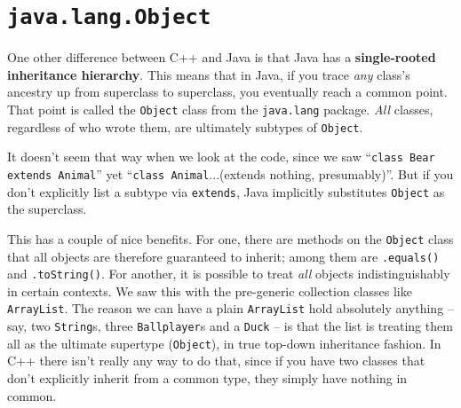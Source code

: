 \section{\texttt{java.lang.Object}}

One other difference between C++ and Java is that Java has a
\textbf{single-rooted inheritance hierarchy}. This means that in Java, if you
trace \textit{any} class's ancestry up from superclass to superclass, you
eventually reach a common point. That point is called the \texttt{Object}
class from the \texttt{java.lang} package. \textit{All} classes, regardless of
who wrote them, are ultimately subtypes of \texttt{Object}.

It doesn't seem that way when we look at the code, since we saw
``\texttt{class Bear extends Animal}'' yet ``\texttt{class Animal}...(extends
nothing, presumably)''. But if you don't explicitly list a subtype via
\texttt{extends}, Java implicitly substitutes \texttt{Object} as the
superclass.

This has a couple of nice benefits. For one, there are methods on the
\texttt{Object} class that all objects are therefore guaranteed to inherit;
among them are \texttt{.equals()} and \texttt{.toString()}. For another, it is
possible to treat \textit{all} objects indistinguishably in certain contexts.
We saw this with the pre-generic collection classes like \texttt{ArrayList}.
The reason we can have a plain \texttt{ArrayList} hold absolutely anything --
say, two \texttt{String}s, three \texttt{Ballplayer}s and a \texttt{Duck} --
is that the list is treating them all as the ultimate supertype
(\texttt{Object}), in true top-down inheritance fashion. In C++ there isn't
really any way to do that, since if you have two classes that don't explicitly
inherit from a common type, they simply have nothing in common.

